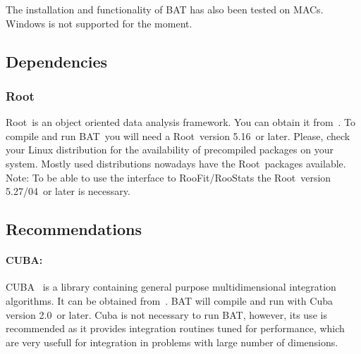 \documentclass[11pt, a4paper]{article}
\newcommand{\bat}{{\sc BAT}}
\newcommand{\Root}{{\sc Root}}
\newcommand{\RootVersion}{5.16}
\newcommand{\RooStatsVersion}{5.27/04}
\newcommand{\CubaVersion}{2.0}
\begin{document}
\noindent
The installation and functionality of BAT has also been tested on MACs. \\

\noindent
Windows is not supported for the moment.


\subsection{Dependencies}

\subsubsection{\Root}
\Root\ is an object oriented data analysis framework. You can obtain it
from~\cite{ROOTweb}. To compile and run \bat\ you will need a \Root\
version \RootVersion\ or later. Please, check your Linux distribution for the
availability of precompiled packages on your system. Mostly used
distributions nowadays have the \Root\ packages available. \\

\noindent
Note: To be able to use the interface to RooFit/RooStats the \Root\
version \RooStatsVersion\ or later is necessary.


\subsection{Recommendations}

\enlargethispage{1cm}

\paragraph{CUBA:}
CUBA~\cite{CUBA} is a library containing general purpose
multidimensional integration algorithms. It can be obtained
from~\cite{CUBAweb}. BAT will compile and run with Cuba version
\CubaVersion\ or later. Cuba is not necessary to run BAT, however, its
use is recommended as it provides integration routines tuned for
performance, which are very usefull for integration in problems with
large number of dimensions.
\end{document}
